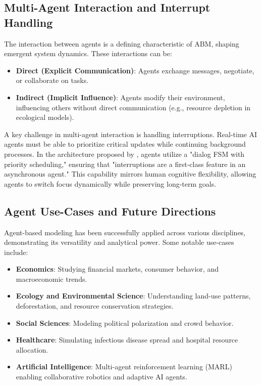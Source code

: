 \subsection{Multi-Agent Interaction and Interrupt Handling}

The interaction between agents is a defining characteristic of ABM, shaping emergent system dynamics. These interactions can be: \begin{itemize} \item \textbf{Direct (Explicit Communication)}: Agents exchange messages, negotiate, or collaborate on tasks. \item \textbf{Indirect (Implicit Influence)}: Agents modify their environment, influencing others without direct communication (e.g., resource depletion in ecological models). \end{itemize}

A key challenge in multi-agent interaction is handling interruptions. Real-time AI agents must be able to prioritize critical updates while continuing background processes. In the architecture proposed by \cite{ginart2024}, agents utilize a "dialog FSM with priority scheduling," ensuring that "interruptions are a first-class feature in an asynchronous agent." This capability mirrors human cognitive flexibility, allowing agents to switch focus dynamically while preserving long-term goals.

\subsection{Agent Use-Cases and Future Directions}

Agent-based modeling has been successfully applied across various disciplines, demonstrating its versatility and analytical power. Some notable use-cases include: \begin{itemize} \item \textbf{Economics}: Studying financial markets, consumer behavior, and macroeconomic trends. \item \textbf{Ecology and Environmental Science}: Understanding land-use patterns, deforestation, and resource conservation strategies. \item \textbf{Social Sciences}: Modeling political polarization and crowd behavior. \item \textbf{Healthcare}: Simulating infectious disease spread and hospital resource allocation. \item \textbf{Artificial Intelligence}: Multi-agent reinforcement learning (MARL) enabling collaborative robotics and adaptive AI agents. \end{itemize}

